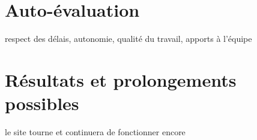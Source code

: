 
\section{Auto-évaluation}
respect des délais, autonomie, qualité du travail, apports à l'équipe


\section{Résultats et prolongements possibles}
le site tourne et continuera de fonctionner encore

